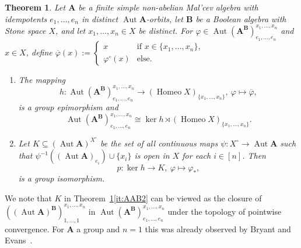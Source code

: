 \documentclass[12pt,a4paper,reqno]{amsart}
\numberwithin{equation}{section}
\theoremstyle{plain}
\newtheorem{thm}{Theorem}[section]
\theoremstyle{definition}
\newcommand{\A}{\mathbf{A}}
\newcommand{\ABxe}{(\mathbf{A^B})^{x_1,\dots,x_n}_{e_1,\dots,e_n}}
\newcommand{\B}{\mathbf{B}}
\DeclareMathOperator{\Aut}{Aut}
\DeclareMathOperator{\Homeo}{Homeo}
\begin{document}
\begin{thm} \label{thm:AutABxe}
 Let $\A$ be a finite simple non-abelian Mal'cev algebra with idempotents $e_1,\dots,e_n$
 in distinct $\Aut\A$-orbits,
 let $\B$ be a Boolean algebra with Stone space $X$,  and let $x_1,\dots,x_n\in X$ be distinct.
 For $\varphi\in\Aut \ABxe$ and $x\in X$, define
 $\overline{\varphi}(x) := \begin{cases}  x & \text{if } x\in\{x_1,\dots,x_n\}, \\ 
 \varphi^\circ(x) & \text{else}. \end{cases}$ 
 \begin{enumerate}
 \item\label{it:AAB1}
The mapping
\[ h\colon \Aut \ABxe \to (\Homeo X)_{\{x_1,\dots,x_n\}},\ \varphi \mapsto \overline{\varphi}, \]
 is a group epimorphism and   
\[ \Aut \ABxe \cong \ker h \rtimes (\Homeo X)_{\{x_1,\dots,x_n\}}. \]
\item\label{it:AAB2}
  Let $K\subseteq (\Aut\A)^{X^\circ}$ be the set of all continuous maps $\psi\colon X^\circ\to \Aut\A$ such that
  $\psi^{-1}((\Aut\A)_{e_i}) \cup \{x_i\}$
 is open in $X$ for each $i\in [n]$.
 Then
\[ p\colon \ker h\to K,\ \varphi\mapsto \varphi_*, \] 
is a group isomorphism.
\end{enumerate}
\end{thm}

 We note that $K$ in Theorem~\ref{thm:AutABxe}\eqref{it:AAB2} can be viewed as the closure of
 $\left((\Aut\A)^\B\right)^{x_1,\dots,x_n}_{1,\dots,1}$ in $\Aut\ABxe$ under the topology of pointwise convergence.
 For $\A$ a group and $n=1$ this was already observed by Bryant and Evans~\cite[Section 2]{BE:SIP}.
\end{document}
